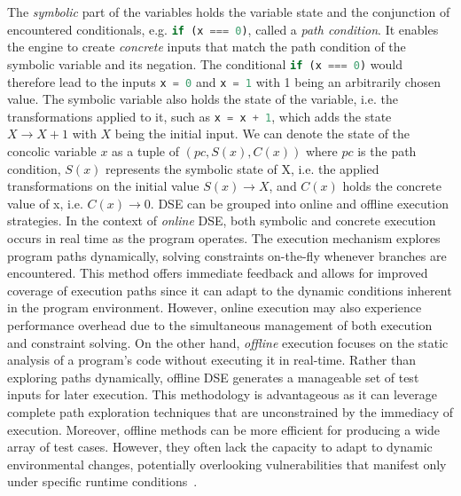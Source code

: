 The \textit{symbolic} part of the variables holds the variable state and the conjunction of encountered conditionals, e.g. \lstinline[language=JavaScript]+if (x === 0)+, called a \textit{path condition}. 
It enables the engine to create \textit{concrete} inputs that match the path condition of the symbolic variable and its negation. 
The conditional
\lstinline[language=JavaScript]+if (x === 0)+ would therefore lead to the inputs 
\lstinline[language=JavaScript]+x = 0+ and
\lstinline[language=JavaScript]+x = 1+ with 1 being an arbitrarily chosen value. The symbolic variable also holds the state of the variable, i.e. the transformations applied to it, such as 
\lstinline[language=JavaScript]@x = x + 1@, 
which adds the state
$X \rightarrow X+1$
 with 
$X$ being the initial input.
We can denote the state of the concolic variable $x$ as a tuple of $(pc, S(x), C(x))$ where  $pc$ is the path condition,  $S(x)$ represents the symbolic state of X, i.e. the applied transformations on the initial value $S(x) \rightarrow X$, and $C(x)$ holds the concrete value of x, i.e. $C(x) \rightarrow 0$.
DSE can be grouped into online and offline execution strategies. 
In the context of \textit{online} DSE, both symbolic and concrete execution occurs in real time as the program operates. 
The execution mechanism explores program paths dynamically, solving constraints on-the-fly whenever branches are encountered. 
This method offers immediate feedback and allows for improved coverage of execution paths since it can adapt to the dynamic conditions inherent in the program environment. 
However, online execution may also experience performance overhead due to the simultaneous management of both execution and constraint solving. 
On the other hand, \textit{offline} execution focuses on the static analysis of a program’s code without executing it in real-time. 
Rather than exploring paths dynamically, offline DSE generates a manageable set of test inputs for later execution. 
This methodology is advantageous as it can leverage complete path exploration techniques that are unconstrained by the immediacy of execution. 
Moreover, offline methods can be more efficient for producing a wide array of test cases. 
However, they often lack the capacity to adapt to dynamic environmental changes, potentially overlooking vulnerabilities that manifest only under specific runtime conditions~\cite{andreasen_survey_2018}.


